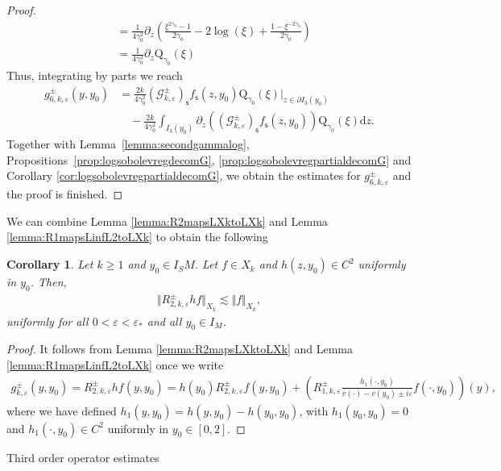 \documentclass[11pt,reqno]{amsproc}
\makeatletter
\renewcommand\subsection{\@startsection{subsection}{2}%
\normalparindent{.5\linespacing\@plus.7\linespacing}{-.5em}
{\normalfont\bfseries}}
\newtheorem{corollary}[proposition]{Corollary}
\theoremstyle{definition}
\numberwithin{equation}{section}
\newcommand{\G}{{\mathcal{G}}}
\newcommand{\s}{{\mathsf{s}}}
\renewcommand{\d}{\mathrm{d}}
\newcommand{\ep}{\varepsilon}
\makeatother
\begin{document}
\begin{proof}
\begin{align*}
&=  \frac{1}{4\gamma_0^2}\partial_z \left( \frac{\xi^{2\gamma_0}-1}{2\gamma_0} - 2\log(\xi) + \frac{1 - \xi^{-2\gamma_0}}{2\gamma_0} \right)\\
&=\frac{1}{4\gamma_0^2}\partial_z \mathrm{Q}_{\gamma_0}(\xi)
\end{align*}
Thus, integrating by parts we reach
\begin{align*}
g_{6,k,\ep}^\pm(y,y_0) &= \frac{2k}{4\gamma_0^2} \left( \G_{k,\ep}^\pm \right)_\s f_\s(z,y_0) \mathrm{Q}_{\gamma_0}(\xi) \Big|_{z\in \partial I_3(y_0)} \\
&\quad - \frac{2k}{4\gamma_0^2}\int_{I_3(y_0)}\partial_z \left( \left( \G_{k,\ep}^\pm \right)_\s f_\s(z,y_0) \right) \mathrm{Q}_{\gamma_0}(\xi) \d z.
\end{align*}
Together with Lemma~\ref{lemma:secondgammalog}, Propositions~\ref{prop:logsobolevregdecomG}, \ref{prop:logsobolevregpartialdecomG} and Corollary \ref{cor:logsobolevregpartialdecomG}, we obtain the estimates for $g_{6,k,\ep}^\pm$ and the proof is finished.
\end{proof}

We can combine Lemma \ref{lemma:R2mapsLXktoLXk} and Lemma \ref{lemma:R1mapsLinfL2toLXk} to obtain the following

\begin{corollary}\label{cor:R2mapsCLXktoLXk}
Let $k\geq 1$ and $y_0\in I_SM$. Let $f\in X_k$ and $h(z,y_0)\in C^2$ uniformly in $y_0$. Then,
\begin{align*}
\Vert R_{2,k,\ep}^\pm hf \Vert_{X_k}\lesssim \Vert f \Vert_{X_k},
\end{align*}
uniformly for all $0<\ep<\ep_*$ and all $y_0\in I_M$. 
\end{corollary}

\begin{proof}
It follows from Lemma \ref{lemma:R2mapsLXktoLXk} and Lemma \ref{lemma:R1mapsLinfL2toLXk} once we write
\begin{align*}
g_{k,\ep}^\pm(y,y_0) = R_{2,k,\ep}^\pm h f(y,y_0) = h(y_0) R_{2,k,\ep}^\pm f(y,y_0) + \left(R_{1,k,\ep}^\pm \frac{h_1(\cdot,y_0)}{v(\cdot) - v(y_0) \pm i\ep}f(\cdot,y_0) \right)(y),
\end{align*}
where we have defined $h_1(y,y_0) = h(y,y_0) - h(y_0,y_0)$, with $h_1(y_0,y_0)=0$ and $h_1(\cdot,y_0)\in C^2$ uniformly in $y_0\in [0,2]$.
\end{proof}

\subsection{Third order operator estimates}
\end{document}
